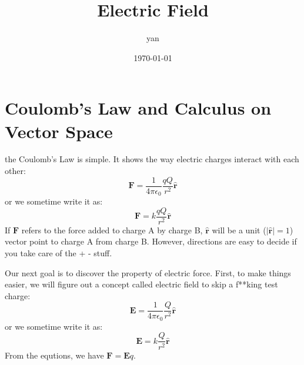 \documentclass{article}
\title{Electric Field}
\author{yan}
\date{\today}
\begin{document}
\part{Coulomb's Law and Calculus on Vector Space}
the Coulomb's Law is simple. It shows the way electric charges interact with each other:
\begin{equation}
\mathbf{F}=\frac{1}{4\pi\epsilon_0}\frac{qQ}{r^2}\mathbf{\hat{r}}
\end{equation}
or we sometime write it as:
\begin{equation}
\mathbf{F}=k\frac{qQ}{r^2}\mathbf{\hat{r}}
\end{equation}
If $\mathbf{F}$ refers to the force added to charge A by charge B, $\mathbf{\hat{r}}$ will be a unit ($|\mathbf{\hat{r}}| = 1$) vector point to charge A from charge B. However, directions are easy to decide if you take care of the + - stuff.


Our next goal is to discover the property of electric force. First, to make things easier, we will figure out a concept called electric field to skip a f**king test charge:
\begin{equation}
\mathbf{E}=\frac{1}{4\pi\epsilon_0}\frac{Q}{r^2}\mathbf{\hat{r}}
\end{equation}
or we sometime write it as:
\begin{equation}
\mathbf{E}=k\frac{Q}{r^2}\mathbf{\hat{r}}
\end{equation}
From the equtions, we have $\mathbf{F} = \mathbf{E}q$.
\end{document}
